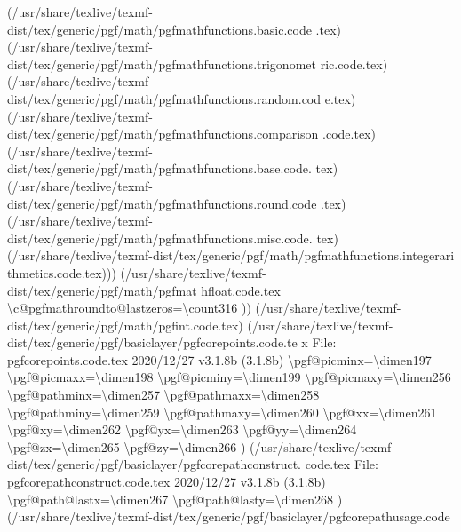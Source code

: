 \documentclass[
  letterpaper,
  DIV=11,
  numbers=noendperiod]{scrartcl}
\newenvironment{Shaded}{\begin{snugshade}}{\end{snugshade}}
\newcommand{\NormalTok}[1]{\textcolor[rgb]{0.00,0.23,0.31}{#1}}
\begin{document}
\begin{Shaded}
\begin{Highlighting}[]
\NormalTok{(/usr/share/texlive/texmf{-}dist/tex/generic/pgf/math/pgfmathfunctions.basic.code}
\NormalTok{.tex)}
\NormalTok{(/usr/share/texlive/texmf{-}dist/tex/generic/pgf/math/pgfmathfunctions.trigonomet}
\NormalTok{ric.code.tex)}
\NormalTok{(/usr/share/texlive/texmf{-}dist/tex/generic/pgf/math/pgfmathfunctions.random.cod}
\NormalTok{e.tex)}
\NormalTok{(/usr/share/texlive/texmf{-}dist/tex/generic/pgf/math/pgfmathfunctions.comparison}
\NormalTok{.code.tex)}
\NormalTok{(/usr/share/texlive/texmf{-}dist/tex/generic/pgf/math/pgfmathfunctions.base.code.}
\NormalTok{tex)}
\NormalTok{(/usr/share/texlive/texmf{-}dist/tex/generic/pgf/math/pgfmathfunctions.round.code}
\NormalTok{.tex)}
\NormalTok{(/usr/share/texlive/texmf{-}dist/tex/generic/pgf/math/pgfmathfunctions.misc.code.}
\NormalTok{tex)}
\NormalTok{(/usr/share/texlive/texmf{-}dist/tex/generic/pgf/math/pgfmathfunctions.integerari}
\NormalTok{thmetics.code.tex))) (/usr/share/texlive/texmf{-}dist/tex/generic/pgf/math/pgfmat}
\NormalTok{hfloat.code.tex}
\NormalTok{\textbackslash{}c@pgfmathroundto@lastzeros=\textbackslash{}count316}
\NormalTok{)) (/usr/share/texlive/texmf{-}dist/tex/generic/pgf/math/pgfint.code.tex)}
\NormalTok{(/usr/share/texlive/texmf{-}dist/tex/generic/pgf/basiclayer/pgfcorepoints.code.te}
\NormalTok{x}
\NormalTok{File: pgfcorepoints.code.tex 2020/12/27 v3.1.8b (3.1.8b)}
\NormalTok{\textbackslash{}pgf@picminx=\textbackslash{}dimen197}
\NormalTok{\textbackslash{}pgf@picmaxx=\textbackslash{}dimen198}
\NormalTok{\textbackslash{}pgf@picminy=\textbackslash{}dimen199}
\NormalTok{\textbackslash{}pgf@picmaxy=\textbackslash{}dimen256}
\NormalTok{\textbackslash{}pgf@pathminx=\textbackslash{}dimen257}
\NormalTok{\textbackslash{}pgf@pathmaxx=\textbackslash{}dimen258}
\NormalTok{\textbackslash{}pgf@pathminy=\textbackslash{}dimen259}
\NormalTok{\textbackslash{}pgf@pathmaxy=\textbackslash{}dimen260}
\NormalTok{\textbackslash{}pgf@xx=\textbackslash{}dimen261}
\NormalTok{\textbackslash{}pgf@xy=\textbackslash{}dimen262}
\NormalTok{\textbackslash{}pgf@yx=\textbackslash{}dimen263}
\NormalTok{\textbackslash{}pgf@yy=\textbackslash{}dimen264}
\NormalTok{\textbackslash{}pgf@zx=\textbackslash{}dimen265}
\NormalTok{\textbackslash{}pgf@zy=\textbackslash{}dimen266}
\NormalTok{)}
\NormalTok{(/usr/share/texlive/texmf{-}dist/tex/generic/pgf/basiclayer/pgfcorepathconstruct.}
\NormalTok{code.tex}
\NormalTok{File: pgfcorepathconstruct.code.tex 2020/12/27 v3.1.8b (3.1.8b)}
\NormalTok{\textbackslash{}pgf@path@lastx=\textbackslash{}dimen267}
\NormalTok{\textbackslash{}pgf@path@lasty=\textbackslash{}dimen268}
\NormalTok{)}
\NormalTok{(/usr/share/texlive/texmf{-}dist/tex/generic/pgf/basiclayer/pgfcorepathusage.code}

\end{Highlighting}
\end{Shaded}
\end{document}

